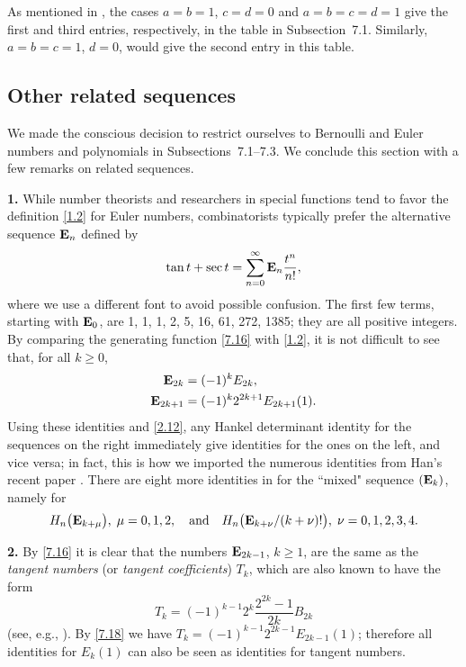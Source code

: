 \documentclass{amsart}
\theoremstyle{plain}
\numberwithin{equation}{section}
\begin{document}
As mentioned in \cite[p.~626]{FK}, the cases $a=b=1$, $c=d=0$ and $a=b=c=d=1$
give the first and third entries, respectively, in the table in Subsection~7.1. 
Similarly, $a=b=c=1$, $d=0$, would give the second entry in this table.

\subsection{Other related sequences}

We made the conscious decision to restrict ourselves to Bernoulli and Euler 
numbers and polynomials in Subsections~7.1--7.3. We conclude this section with
a few remarks on related sequences.

{\bf 1.} While number theorists and researchers in special functions tend to 
favor the definition \eqref{1.2} for Euler numbers, combinatorists typically 
prefer the alternative sequence ${\bf E}_n$ defined by
\begin{equation}\label{7.16}
\tan{t}+\sec{t} = \sum_{n=0}^{\infty}{\bf E}_n\frac{t^n}{n!},
\end{equation}
where we use a different font to avoid possible confusion. The first few terms,
starting with ${\bf E}_0$, are 1, 1, 1, 2, 5, 16, 61, 272, 1385; they are all
positive integers. By comparing the generating function \eqref{7.16} with 
\eqref{1.2}, it is not difficult to see that, for all $k\geq 0$,
\begin{align}
{\bf E}_{2k} &= (-1)^kE_{2k},\label{7.17}\\
{\bf E}_{2k+1} &= (-1)^k 2^{2k+1}E_{2k+1}(1).\label{7.18}
\end{align}
Using these identities and \eqref{2.12}, any Hankel determinant identity for
the sequences on the right immediately give identities for the ones on the left,
and vice versa; in fact, this is how we imported the numerous identities from
Han's recent paper \cite{Ha}. There are eight more identities in \cite{Ha} for
the ``mixed" sequence $({\bf E}_k)$, namely for
\[
H_n\big({\bf E}_{k+\mu}\big),\;\mu=0,1,2,\quad\hbox{and}\quad
H_n\big({\bf E}_{k+\nu}/(k+\nu)!\big),\;\nu=0,1,2,3,4.
\]

{\bf 2.} By \eqref{7.16} it is clear that the numbers ${\bf E}_{2k-1}$, 
$k\geq 1$, are the same as the {\it tangent numbers} (or {\it tangent
coefficients}) $T_k$, which are also known to have the form
\[
T_k = (-1)^{k-1}2^k\frac{2^{2k}-1}{2k}B_{2k}
\]
(see, e.g., \cite[Eq.~4.19.3]{DLMF}). By \eqref{7.18} we have
$T_k=(-1)^{k-1}2^{2k-1}E_{2k-1}(1)$; therefore all identities for $E_k(1)$ can
also be seen as identities for tangent numbers.
\end{document}
